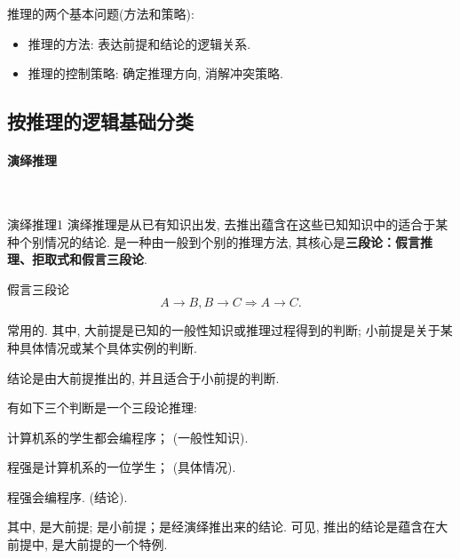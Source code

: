 推理的两个基本问题(方法和策略):
\begin{itemize}
\item 推理的方法: 表达前提和结论的逻辑关系.
\item 推理的控制策略: 确定推理方向, 消解冲突策略.
\end{itemize}
\subsection{按推理的逻辑基础分类}
\paragraph{演绎推理}~{}
\begin{mydef}{演绎推理}{1}
演绎推理是从已有知识出发, 去推出蕴含在这些已知知识中的适合于某种个别情况的结论. 是一种由一般到个别的推理方法, 其核心是\textcolor[rgb]{0,0,1}{\textbf{三段论：假言推理、拒取式和假言三段论}}.
\end{mydef}

\begin{example}
  假言三段论
$$A\rightarrow B, B\rightarrow C \Rightarrow A\rightarrow C.$$
\end{example}

常用的. 其中, 大前提是已知的一般性知识或推理过程得到的判断; 小前提是关于某种具体情况或某个具体实例的判断.
\begin{remark}
    结论是由大前提推出的, 并且适合于小前提的判断.
\end{remark}

\begin{example}
有如下三个判断是一个三段论推理:

      计算机系的学生都会编程序；   (一般性知识).

      程强是计算机系的一位学生；   (具体情况).

      程强会编程序.            (结论).
\end{example}
其中, 是大前提; 是小前提；是经演绎推出来的结论.
可见, 推出的结论是蕴含在大前提中, 是大前提的一个特例.
